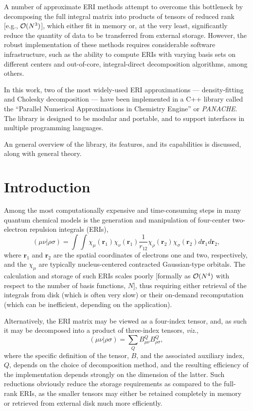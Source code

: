 \documentclass[12pt,letterpaper]{article}
\renewcommand{\vec}[1]{\ensuremath{\bm{#1}}\xspace}
\newcommand{\panache}{\textit{PANACHE}\xspace}
\begin{document}
A number of approximate ERI methods attempt to overcome this bottleneck by
decomposing the full integral matrix into products of tensors of reduced rank
[e.g., ${\cal O}(N^3)$], which either fit in memory or, at the very least,
significantly reduce the quantity of data to be transferred from external
storage.  However, the robust implementation of these methods requires
considerable software infrastructure, such as the ability to compute ERIs with
varying basis sets on different centers and out-of-core, integral-direct
decomposition algorithms, among others.

In this work, two of the most widely-used ERI approximations ---
density-fitting and Cholesky decomposition --- have been implemented in a C++
library called the ``Parallel Numerical Approximations in Chemistry Engine''
or \panache. The library is designed to be modular and portable, and to
support interfaces in multiple programming languages.

An general overview of the library, its
features, and its capabilities is discussed, along with general theory.

\clearpage


\section{Introduction}
\label{sec:intro} 

Among the most computationally expensive and time-consuming steps in many
quantum chemical models is the generation and manipulation of four-center
two-electron repulsion integrals (ERIs),
\begin{equation}
(\mu \nu | \rho \sigma) = \int \int \chi_\mu(\vec{r}_1) \chi_\nu(\vec{r}_1)
\frac{1}{r_{12}} \chi_\rho(\vec{r}_2) \chi_\sigma(\vec{r}_2)
d\vec{r}_1 d\vec{r}_2,
\end{equation}
where $\vec{r}_1$ and $\vec{r}_2$ are the spatial coordinates of electrons one
and two, respectively, and the $\chi_\mu$ are typically nucleus-centered
contracted Gaussian-type orbitals.  The calculation and storage of such ERIs
scales poorly [formally as ${\cal O}(N^4)$ with respect to the number of basis
functions, $N$], thus requiring either retrieval of the integrals from disk
(which is often very slow) or their on-demand recomputation (which can be
inefficient, depending on the application).

Alternatively, the ERI matrix may be viewed as a four-index tensor, and, as
such it may be decomposed into a product of three-index tensors, {\em viz.},
\begin{equation}
(\mu \nu | \rho \sigma) = \sum_{Q} B_{\mu \nu}^Q B_{\rho \sigma}^Q,
\end{equation}
where the specific definition of the tensor, $B$, and the associated auxiliary
index, $Q$, depends on the choice of decomposition method, and the resulting
efficiency of the implementation depends strongly on the dimension of the
latter.  Such reductions obviously reduce the storage requirements as compared
to the full-rank ERIs, as the smaller tensors may either be retained
completely in memory or retrieved from external disk much more efficiently.
\end{document}
